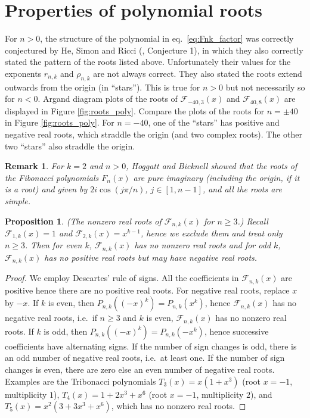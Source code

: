 \documentclass[review]{elsarticle}
\theoremstyle{plain}
\newtheorem{remark}[theorem]{Remark}
\newtheorem{proposition}[theorem]{Proposition}
\begin{document}
\section{Properties of polynomial roots}\label{sec:poly_roots}
For $n>0$, the structure of the polynomial in eq.~\eqref{eq:Fnk_factor} was correctly conjectured by He, Simon and Ricci (\cite{HeSimonRicci_num}, Conjecture 1),
in which they also correctly stated the pattern of the roots listed above.
Unfortunately their values for the exponents $r_{n,k}$ and $\rho_{n,k}$ are not always correct.
They also stated the roots extend outwards from the origin (in ``stars'').
This is true for $n>0$ but not necessarily so for $n<0$.
Argand diagram plots of the roots of $\mathcal{F}_{-40,3}(x)$ and $\mathcal{F}_{40,8}(x)$ are displayed in Figure \ref{fig:roots_poly}.
Compare the plots of the roots for $n=\pm40$ in Figure \ref{fig:roots_poly}.
For $n=-40$, one of the ``stars'' has positive and negative real roots, which straddle the origin (and two complex roots).
The other two ``stars'' also straddle the origin.
\begin{remark}\label{rem:root_k2}
  For $k=2$ and $n>0$, Hoggatt and Bicknell \cite{HoggattBicknell_roots} 
  showed that the roots of the Fibonacci polynomials $F_n(x)$ are pure imaginary
  (including the origin, if it is a root) and given by $2i \cos(j\pi/n)$, $j\in[1,n-1]$,
  and all the roots are simple.
\end{remark}
\begin{proposition}\label{prop:realroots}
(The nonzero real roots of $\mathcal{F}_{n,k}(x)$ for $n\ge3$.)
Recall $\mathcal{F}_{1,k}(x)=1$ and $\mathcal{F}_{2,k}(x)=x^{k-1}$, hence we exclude them and treat only $n\ge3$. Then
for even $k$, $\mathcal{F}_{n,k}(x)$ has no nonzero real roots and
for odd $k$, $\mathcal{F}_{n,k}(x)$ has no positive real roots but may have negative real roots.
\end{proposition}
\begin{proof}
We employ Descartes' rule of signs.
All the coefficients in $\mathcal{F}_{n,k}(x)$ are positive hence there are no positive real roots.
For negative real roots, replace $x$ by $-x$.
If $k$ is even, then $P_{n,k}((-x)^k)= P_{n,k}(x^k)$, hence $\mathcal{F}_{n,k}(x)$ has no negative real roots,
i.e.~if $n\ge3$ and $k$ is even, $\mathcal{F}_{n,k}(x)$ has no nonzero real roots.
If $k$ is odd, then $P_{n,k}((-x)^k)= P_{n,k}(-x^k)$,
hence successive coefficients have alternating signs.
If the number of sign changes is odd, there is an odd number of negative real roots, i.e.~at least one.
If the number of sign changes is even, there are zero else an even number of negative real roots.
Examples are the Tribonacci polynomials
$T_3(x) = x(1 +x^3)$ (root $x=-1$, multiplicity $1$), 
$T_4(x) = 1 +2x^3 +x^6$ (root $x=-1$, multiplicity $2$), and
$T_5(x) = x^2(3 +3x^3 +x^6)$, which has no nonzero real roots.
\end{proof}
\end{document}
